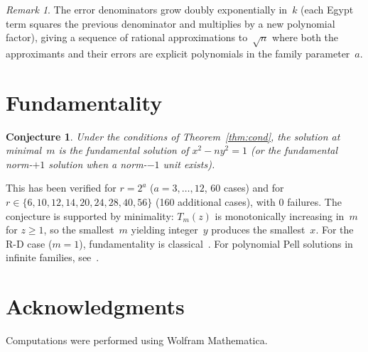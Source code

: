 \documentclass[11pt]{article}
\newtheorem{conjecture}[theorem]{Conjecture}
\theoremstyle{definition}
\theoremstyle{remark}
\newtheorem{remark}[theorem]{Remark}
\begin{document}
\begin{remark}
The error denominators grow doubly exponentially in~$k$
(each Egypt term squares the previous denominator and multiplies
by a new polynomial factor), giving a sequence of rational
approximations to~$\sqrt{n}$ where both the approximants and
their errors are explicit polynomials in the family parameter~$a$.
\end{remark}

\section{Fundamentality}

\begin{conjecture}\label{conj:fund}
Under the conditions of Theorem~\ref{thm:cond}, the solution at
minimal~$m$ is the fundamental solution of $x^2 - ny^2 = 1$
(or the fundamental norm-$+1$ solution when a norm-$-1$ unit exists).
\end{conjecture}

This has been verified for $r = 2^a$ ($a = 3, \ldots, 12$, 60 cases)
and for $r \in \{6, 10, 12, 14, 20, 24, 28, 40, 56\}$
(160 additional cases), with 0 failures.
The conjecture is supported by minimality: $T_m(z)$ is
monotonically increasing in~$m$ for $z \ge 1$, so the smallest~$m$
yielding integer~$y$ produces the smallest~$x$.
For the R-D case ($m = 1$), fundamentality is classical~\cite{mollin1992}.
For polynomial Pell solutions in infinite families, see~\cite{mclaughlin2003}.

\section*{Acknowledgments}

Computations were performed using Wolfram Mathematica.



\end{document}
